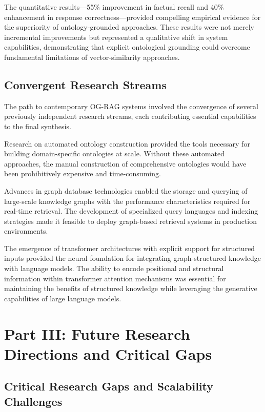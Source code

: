 The quantitative results—55\% improvement in factual recall and 40\% enhancement in response correctness—provided compelling empirical evidence for the superiority of ontology-grounded approaches. These results were not merely incremental improvements but represented a qualitative shift in system capabilities, demonstrating that explicit ontological grounding could overcome fundamental limitations of vector-similarity approaches.

\subsection{Convergent Research Streams}

The path to contemporary OG-RAG systems involved the convergence of several previously independent research streams, each contributing essential capabilities to the final synthesis.

Research on automated ontology construction \cite{fernandez2019ontology} provided the tools necessary for building domain-specific ontologies at scale. Without these automated approaches, the manual construction of comprehensive ontologies would have been prohibitively expensive and time-consuming.

Advances in graph database technologies \cite{angles2018foundations} enabled the storage and querying of large-scale knowledge graphs with the performance characteristics required for real-time retrieval. The development of specialized query languages and indexing strategies made it feasible to deploy graph-based retrieval systems in production environments.

The emergence of transformer architectures with explicit support for structured inputs \cite{shaw2018self} provided the neural foundation for integrating graph-structured knowledge with language models. The ability to encode positional and structural information within transformer attention mechanisms was essential for maintaining the benefits of structured knowledge while leveraging the generative capabilities of large language models.

\section{Part III: Future Research Directions and Critical Gaps}

\subsection{Critical Research Gaps and Scalability Challenges}

